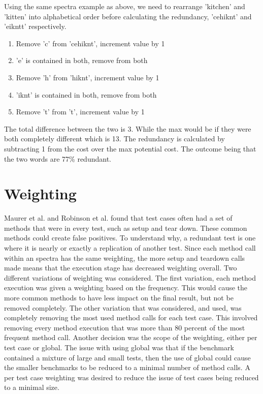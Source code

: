 Using the same spectra example as above, we need to rearrange 'kitchen' and 'kitten' into alphabetical order before calculating the redundancy, 'cehiknt' and 'eikntt' respectively.

\begin{enumerate}
\item Remove 'c' from 'cehiknt', increment value by 1
\item 'e' is contained in both, remove from both
\item Remove 'h' from 'hiknt', increment value by 1
\item 'iknt' is contained in both, remove from both
\item Remove 't' from 't', increment value by 1
\end{enumerate}

The total difference between the two is 3. While the max would be if they were both completely different which is 13. The redundancy is calculated by subtracting 1 from the cost over the max potential cost. The outcome being that the two words are 77\% redundant.
 
\section{Weighting}

Maurer et al. \cite{koochakzadeh2009test} and Robinson et al. \cite{li2008static} found that test cases often had a set of methods that were in every test, such as setup and tear down. These common methods could create false positives. To understand why, a redundant test is one where it is nearly or exactly a replication of another test. Since each method call within an spectra has the same weighting, the more setup and teardown calls made means that the execution stage has decreased weighting overall. Two different variations of weighting was considered. The first variation,  each method execution was given a weighting based on the frequency. This would cause the more common methods to have less impact on the final result, but not be removed completely. The other variation that was considered, and used, was completely removing the most used method calls for each test case. This involved removing every method execution that was more than 80 percent of the most frequent method call. Another decision was the scope of the weighting, either per test case or global. The issue with using global was that if the benchmark contained a mixture of large and small tests, then the use of global could cause the smaller benchmarks to be reduced to a minimal number of method calls. A per test case weighting was desired to reduce the issue of test cases being reduced to a minimal size.

